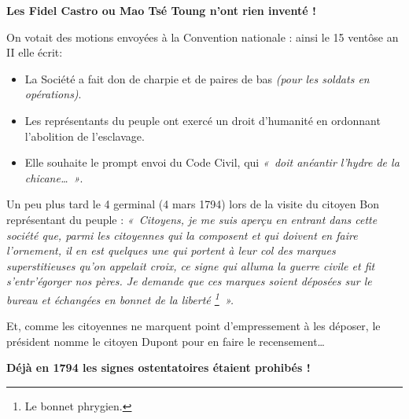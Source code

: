 {\medskip

\textbf{Les Fidel Castro ou Mao Tsé Toung n’ont rien inventé !}

On votait des motions envoyées à la Convention nationale : ainsi le 15 ventôse an II elle écrit:

\medskip

\begin{itemize}
\item La Société a fait don de charpie et de paires de bas \textit{(pour les soldats en opérations)}.
\item Les représentants du peuple ont exercé un droit d’humanité en ordonnant l’abolition de l’esclavage.
\item Elle souhaite le prompt envoi du Code Civil, qui \textit{«~doit anéantir l’hydre de la chicane…~»}.
\end{itemize}

\medskip

Un peu plus tard le 4 germinal (4 mars 1794) lors de la visite du citoyen Bon représentant du peuple : \textit{«~Citoyens, je me suis aperçu en entrant dans cette société que, parmi les citoyennes qui la composent et qui doivent en faire l’ornement, il en est quelques une qui portent à leur col des marques superstitieuses qu’on appelait croix, ce signe qui alluma la guerre civile et fit s’entr’égorger nos pères. Je demande que ces marques soient déposées sur le bureau et échangées en bonnet de la liberté \footnote{Le bonnet phrygien.}~».}

Et, comme les citoyennes ne marquent point d’empressement à les déposer, le président nomme le citoyen Dupont pour en faire le recensement…

\medskip

\textbf{Déjà en 1794 les signes ostentatoires étaient prohibés !}

}


